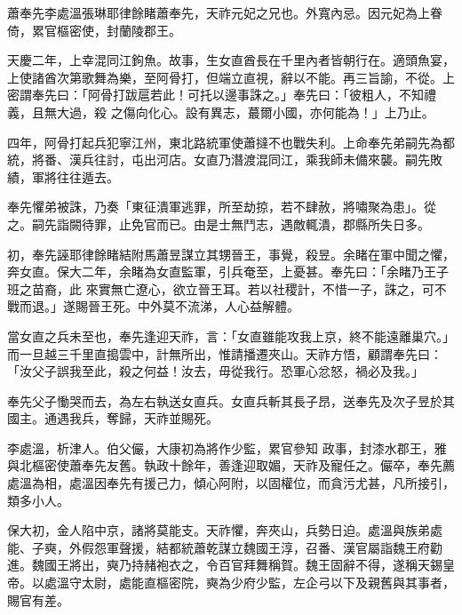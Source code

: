 
\begin{pinyinscope}

 蕭奉先李處溫張琳耶律餘睹蕭奉先，天祚元妃之兄也。外寬內忌。因元妃為上眷倚，累官樞密使，封蘭陵郡王。



 天慶二年，上幸混同江鉤魚。故事，生女直酋長在千里內者皆朝行在。適頭魚宴，上使諸酋次第歌舞為樂，至阿骨打，但端立直視，辭以不能。再三旨諭，不從。上密謂奉先曰：「阿骨打跋扈若此！可托以邊事誅之。」奉先曰：「彼粗人，不知禮義，且無大過，殺
 之傷向化心。設有異志，蕞爾小國，亦何能為！」上乃止。



 四年，阿骨打起兵犯寧江州，東北路統軍使蕭撻不也戰失利。上命奉先弟嗣先為都統，將番、漢兵往討，屯出河店。女直乃潛渡混同江，乘我師未備來襲。嗣先敗績，軍將往往遁去。



 奉先懼弟被誅，乃奏「東征潰軍逃罪，所至劫掠，若不肆赦，將嘯聚為患」。從之。嗣先詣闕待罪，止免官而已。由是士無鬥志，遇敵輒潰，郡縣所失日多。



 初，奉先誣耶律餘睹結附馬蕭昱謀立其甥晉王，事覺，殺昱。余睹在軍中聞之懼，奔女直。保大二年，余睹為女直監軍，引兵奄至，上憂甚。奉先曰：「余睹乃王子班之苗裔，此
 來實無亡遼心，欲立晉王耳。若以社稷計，不惜一子，誅之，可不戰而退。」遂賜晉王死。中外莫不流涕，人心益解體。



 當女直之兵未至也，奉先逢迎天祚，言：「女直雖能攻我上京，終不能遠離巢穴。」而一旦越三千里直搗雲中，計無所出，惟請播遷夾山。天祚方悟，顧謂奉先曰：「汝父子誤我至此，殺之何益！汝去，毋從我行。恐軍心忿怒，禍必及我。」



 奉先父子慟哭而去，為左右執送女直兵。女直兵斬其長子昂，送奉先及次子昱於其國主。通遇我兵，奪歸，天祚並賜死。



 李處溫，析津人。伯父儼，大康初為將作少監，累官參知
 政事，封漆水郡王，雅與北樞密使蕭奉先友舊。執政十餘年，善逢迎取媚，天祚及寵任之。儼卒，奉先薦處溫為相，處溫因奉先有援己力，傾心阿附，以固權位，而貪污尤甚，凡所接引，類多小人。



 保大初，金人陷中京，諸將莫能支。天祚懼，奔夾山，兵勢日迫。處溫與族弟處能、子奭，外假怨軍聲援，結都統蕭乾謀立魏國王淳，召番、漢官屬詣魏王府勸進。魏國王將出，奭乃持赭袍衣之，令百官拜舞稱賀。魏王固辭不得，遂稱天錫皇帝。以處溫守太尉，處能直樞密院，奭為少府少監，左企弓以下及親舊與其事者，賜官有差。




\end{pinyinscope}
